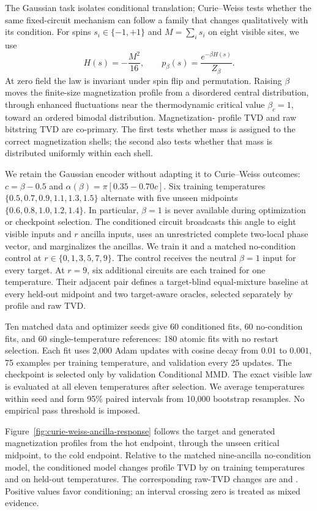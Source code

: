 \documentclass[a4paper,twocolumn,11pt,unpublished]{quantumarticle}
\newif\ifcurieweissancillaresults
\begin{document}
The Gaussian task isolates conditional translation; Curie--Weiss tests
whether the same fixed-circuit mechanism can follow a family that changes
qualitatively with its condition.  For spins $s_i\in\{-1,+1\}$ and
$M=\sum_i s_i$ on eight visible sites, we use
\begin{equation}
 H(s)=-\frac{M^2}{16},\qquad p_\beta(s)=\frac{e^{-\beta H(s)}}{Z_\beta}.
\end{equation}
At zero field the law is invariant under spin flip and permutation.  Raising
$\beta$ moves the finite-size magnetization profile from a disordered central
distribution, through enhanced fluctuations near the thermodynamic critical
value $\beta_c=1$, toward an ordered bimodal distribution.  Magnetization-
profile TVD and raw bitstring TVD are co-primary.  The first tests whether mass
is assigned to the correct magnetization shells; the second also tests whether
that mass is distributed uniformly within each shell.

We retain the Gaussian encoder without adapting it to Curie--Weiss outcomes:
$c=\beta-0.5$ and $\alpha(\beta)=\pi[0.35-0.70c]$.  Six training temperatures
$\{0.5,0.7,0.9,1.1,1.3,1.5\}$ alternate with five unseen midpoints
$\{0.6,0.8,1.0,1.2,1.4\}$.  In particular,
$\beta=1$ is never available during optimization or checkpoint selection.
The conditioned circuit broadcasts this angle to eight visible inputs and
$r$ ancilla inputs, uses an unrestricted complete two-local phase vector, and
marginalizes the ancillas.  We train it and a matched no-condition control at
$r\in\{0,1,3,5,7,9\}$.  The control receives the neutral $\beta=1$ input for
every target.  At $r=9$, six additional circuits are each trained for one
temperature.  Their adjacent pair defines a target-blind equal-mixture
baseline at every held-out midpoint and two target-aware oracles, selected
separately by profile and raw TVD.

Ten matched data and optimizer seeds give 60 conditioned fits, 60
no-condition fits, and 60 single-temperature references: 180 atomic fits with
no restart selection.  Each fit uses 2,000 Adam updates with cosine decay from
$0.01$ to $0.001$, 75 examples per training temperature, and validation every
25 updates.  The checkpoint is selected only by validation Conditional MMD.
The exact visible law is evaluated at all eleven temperatures after selection.
We average temperatures within seed and form 95\% paired intervals from 10,000
bootstrap resamples.  No empirical pass threshold is imposed.

\ifcurieweissancillaresults
Figure~\ref{fig:curie-weiss-ancilla-response} follows the target and generated
magnetization profiles from the hot endpoint, through the unseen critical
midpoint, to the cold endpoint.  Relative to the matched nine-ancilla
no-condition model, the conditioned model changes profile TVD by
\CWAncillaProfileControlTraining{} on training temperatures and
\CWAncillaProfileControlHeldOut{} on held-out temperatures.  The corresponding
raw-TVD changes are \CWAncillaRawControlTraining{} and
\CWAncillaRawControlHeldOut{}.  Positive values favor conditioning; an
interval crossing zero is treated as mixed evidence.
\end{document}
